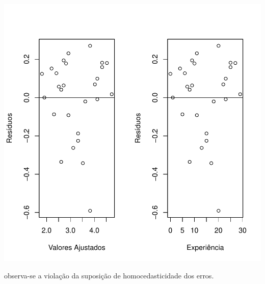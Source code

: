 \documentclass[14pt,aspectratio=1610]{beamer}
\begin{document}
\begin{frame}[fragile]{}
\frametitle{ }
\vspace{-0.5cm}

\begin{center}
\includegraphics{Aula4Regressao/Figuras/Aula4-020}
\end{center}
\vspace{-0.5cm}
\begin{block}{}
observa-se a violação da suposição de homocedasticidade dos erros.
\end{block}
\end{frame}
\end{document}
